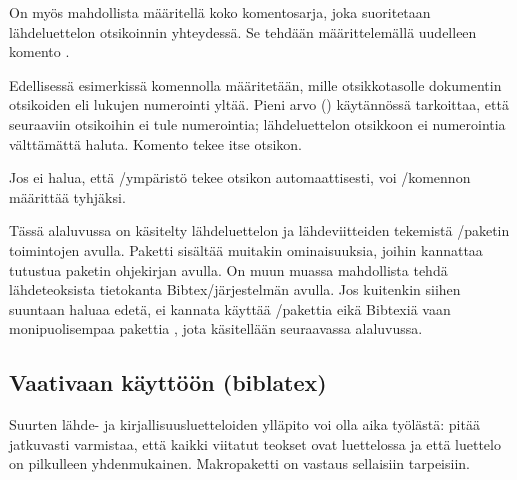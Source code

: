 \begin{koodilohkosis}
  \addto{\captionsfinnish}{%
    \renewcommand{\refname}{Lähteet} %
    \renewcommand{\bibname}{Lähteet} %
  }
\end{koodilohkosis}

On myös mahdollista määritellä koko komentosarja, joka suoritetaan
lähdeluettelon otsikoinnin yhteydessä. Se tehdään määrittelemällä
uudelleen komento .

\begin{koodilohkosis}
  \renewcommand{\bibsection}{%
    \setcounter{secnumdepth}{-1}
    \section{Lähteet}
  }
\end{koodilohkosis}

Edellisessä esimerkissä komennolla 
määritetään, mille otsikkotasolle dokumentin otsikoiden eli lukujen
numerointi yltää. Pieni arvo \mbox{()} käytännössä tarkoittaa,
että seuraaviin otsikoihin ei tule numerointia; lähdeluettelon otsikkoon
ei numerointia välttämättä haluta. Komento  tekee
itse otsikon.

Jos ei halua, että \-/ympäristö tekee otsikon
automaattisesti, voi \-/komennon määrittää
tyhjäksi.

\begin{koodilohkosis}
  \renewcommand{\bibsection}{}
\end{koodilohkosis}

Tässä alaluvussa on käsitelty lähdeluettelon ja lähdeviitteiden
tekemistä \-/paketin toimintojen avulla. Paketti
sisältää muitakin ominaisuuksia, joihin kannattaa tutustua paketin
ohjekirjan avulla. On muun muassa mahdollista tehdä lähdeteoksista
tietokanta Bibtex\-/järjestelmän avulla. Jos kuitenkin siihen suuntaan
haluaa edetä, ei kannata käyttää \-/pakettia eikä
Bibtexiä vaan monipuolisempaa pakettia , jota
käsitellään seuraavassa alaluvussa.

\subsection{Vaativaan käyttöön (biblatex)}
\label{luku:biblatex}

Suurten lähde- ja kirjallisuusluetteloiden ylläpito voi olla aika
työlästä: pitää jatkuvasti varmistaa, että kaikki viitatut teokset ovat
luettelossa ja että luettelo on pilkulleen yhdenmukainen. Makropaketti
 on vastaus sellaisiin tarpeisiin.

